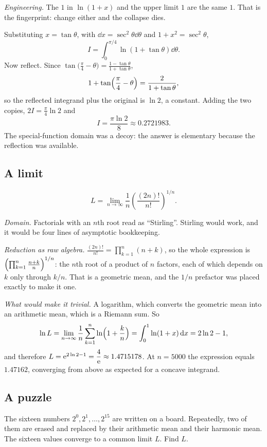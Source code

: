 \emph{Engineering.} The $1$ in $\ln(1+x)$ and the upper limit $1$ are the same $1$. That is the fingerprint: change either and the collapse dies.

Substituting $x=\tan\theta$, with $\dd x=\sec^{2}\theta\dd\theta$ and $1+x^{2}=\sec^{2}\theta$,
\[
I=\int_{0}^{\pi/4}\ln(1+\tan\theta)\dd\theta .
\]
Now reflect. Since $\tan\bigl(\tfrac{\pi}{4}-\theta\bigr)=\frac{1-\tan\theta}{1+\tan\theta}$,
\[
1+\tan\Bigl(\frac{\pi}{4}-\theta\Bigr)=\frac{2}{1+\tan\theta},
\]
so the reflected integrand plus the original is $\ln 2$, a constant. Adding the two copies, $2I=\frac{\pi}{4}\ln 2$ and
\[
I=\frac{\pi\ln 2}{8}\approx 0.2721983 .
\]
The special-function domain was a decoy: the answer is elementary because the reflection was available.

\subsection{A limit}

\[
L=\lim_{n\to\infty}\frac{1}{n}\left(\frac{(2n)!}{n!}\right)^{1/n} .
\]

\emph{Domain.} Factorials with an $n$th root read as ``Stirling''. Stirling would work, and it would be four lines of asymptotic bookkeeping.

\emph{Reduction as raw algebra.} $\frac{(2n)!}{n!}=\prod_{k=1}^{n}(n+k)$, so the whole expression is $\Bigl(\prod_{k=1}^{n}\frac{n+k}{n}\Bigr)^{1/n}$: the $n$th root of a product of $n$ factors, each of which depends on $k$ only through $k/n$. That is a geometric mean, and the $1/n$ prefactor was placed exactly to make it one.

\emph{What would make it trivial.} A logarithm, which converts the geometric mean into an arithmetic mean, which is a Riemann sum. So
\[
\ln L=\lim_{n\to\infty}\frac{1}{n}\sum_{k=1}^{n}\ln\Bigl(1+\frac{k}{n}\Bigr)=\int_{0}^{1}\ln(1+x)\,\mathrm{d} x=2\ln 2-1,
\]
and therefore $L=\mathrm{e}^{2\ln 2-1}=\dfrac{4}{\mathrm{e}}\approx 1.4715178$. At $n=5000$ the expression equals $1.47162$, converging from above as expected for a concave integrand.

\subsection{A puzzle}

The sixteen numbers $2^{0},2^{1},\dots,2^{15}$ are written on a board. Repeatedly, two of them are erased and replaced by their arithmetic mean and their harmonic mean. The sixteen values converge to a common limit $L$. Find $L$.

